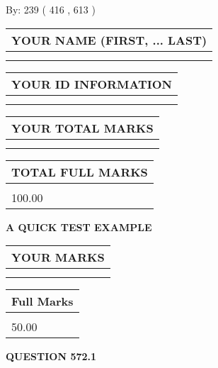 \documentclass[12pt]{article}
\begin{document}
   
\hspace{1.0in} By: 
 239 ( 416 ,  613 )
   
   
   
   
\newpage 
\setcounter{page}{ 
   572001 } 
   
   
   
   
\noindent\begin{tabular}{|l|}
\hline
YOUR NAME (FIRST, ... LAST)  \\
\hline
 \\ 
 \\ 
\hline
\end{tabular}
\hspace{0.05in} \begin{tabular}{|l|}
\hline
 YOUR   ID   INFORMATION  \\
\hline
 \\ 
 \\ 
\hline
\end{tabular}
   
   
\vspace{0.2in}\noindent\begin{tabular}{|l|}
\hline
YOUR TOTAL MARKS  \\
\hline
 \\ 
 \\ 
\hline
\end{tabular}
\hspace{0.05in} \begin{tabular}{|l|}
\hline
TOTAL FULL MARKS  \\
\hline
 \\ 
100.00 \\
\hline
\end{tabular}
   
   
 \vspace{0.2in}
{\LARGE {\textbf{ A QUICK TEST EXAMPLE}}}
   
   
  
\vspace{0.2in}
  
\noindent\begin{tabular}{|l|}
\hline
 YOUR MARKS  \\
\hline
 \\ 
 \\ 
\hline
\end{tabular}
\hspace{0.05in} \begin{tabular}{|l|}
\hline
 Full Marks  \\
\hline
 \\ 
50.00 \\
\hline
\end{tabular}
{\textbf{\Large{QUESTION
572.1 
}}}
  
\end{document}
